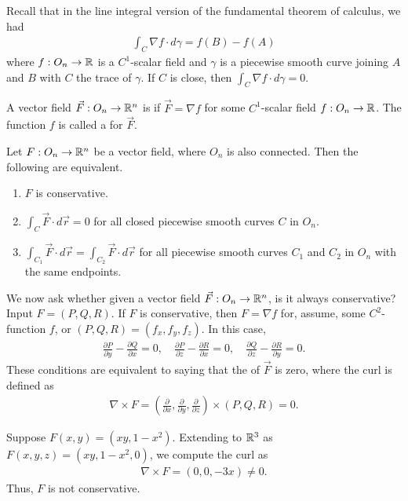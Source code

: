 Recall that in the line integral version of the fundamental theorem of calculus, we had
\begin{align}
    \int_{C} \nabla f \cdot d\gamma = f(B) - f(A)
\end{align}
where $f:O_{n} \to \mathbb{R}$ is a $C^{1}$-scalar field and $\gamma$ is a piecewise smooth curve joining $A$ and $B$ with $C$ the trace of $\gamma$. If $C$ is close, then $\int_{C} \nabla f \cdot d\gamma = 0$.

\begin{definition}
    A vector field $\vec{F}:O_{n} \to \mathbb{R}^{n}$ is  if $\vec{F} = \nabla f$ for some $C^{1}$-scalar field $f:O_{n} \to \mathbb{R}$. The function $f$ is called a  for $\vec{F}$.
\end{definition}

Let $F:O_{n} \to \mathbb{R}^{n}$ be a vector field, where $O_{n}$ is also connected. Then the following are equivalent.
\begin{enumerate}
    \item $F$ is conservative.
    \item $\int_{C} \vec{F} \cdot d\vec{r} = 0$ for all closed piecewise smooth curves $C$ in $O_{n}$.
    \item $\int_{C_{1}} \vec{F} \cdot d\vec{r} = \int_{C_{2}} \vec{F} \cdot d\vec{r}$ for all piecewise smooth curves $C_{1}$ and $C_{2}$ in $O_{n}$ with the same endpoints.
\end{enumerate}

We now ask whether given a vector field $\vec{F}:O_{n} \to \mathbb{R}^{n}$, is it always conservative? Input $F = (P,Q,R)$. If $F$ is conservative, then $F = \nabla f$ for, assume, some $C^{2}$-function $f$, or $(P,Q,R) = (f_{x},f_{y},f_{z})$. In this case,
\begin{align}
    \frac{\partial P}{\partial y} - \frac{\partial Q}{\partial x} = 0,\quad \frac{\partial P}{\partial z} - \frac{\partial R}{\partial x} = 0,\quad \frac{\partial Q}{\partial z} - \frac{\partial R}{\partial y} = 0.
\end{align}
These conditions are equivalent to saying that the  of $\vec{F}$ is zero, where the curl is defined as
\begin{align}
    \nabla \times F = \left( \frac{\partial}{\partial x}, \frac{\partial}{\partial y}, \frac{\partial}{\partial z} \right) \times (P,Q,R) = 0.
\end{align}

\begin{example}
    Suppose $F(x,y) = (xy,1-x^{2})$. Extending to $\mathbb{R}^{3}$ as $F(x,y,z) = (xy,1-x^{2},0)$, we compute the curl as
    \begin{align}
        \nabla \times F = (0,0,-3x) \neq 0.
    \end{align}
    Thus, $F$ is not conservative.
\end{example}

